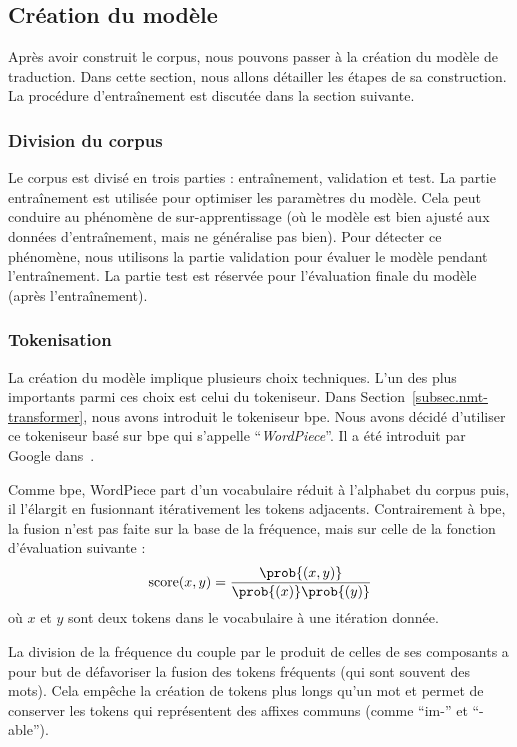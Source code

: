 \subsection{Création du modèle}

Après avoir construit le corpus, nous pouvons passer à la création du modèle de traduction.
Dans cette section, nous allons détailler les étapes de sa construction.
La procédure d'entraînement est discutée dans la section suivante.

\subsubsection{Division du corpus}

Le corpus est divisé en trois parties : entraînement, validation et test.
La partie entraînement est utilisée pour optimiser les paramètres du modèle.
Cela peut conduire au phénomène de sur-apprentissage 
(où le modèle est bien ajusté aux données d'entraînement, mais ne généralise pas bien).
Pour détecter ce phénomène, nous utilisons la partie validation pour évaluer le modèle pendant l'entraînement.
La partie test est réservée pour l'évaluation finale du modèle (après l'entraînement).

\subsubsection{Tokenisation}

La création du modèle implique plusieurs choix techniques.
L'un des plus importants parmi ces choix est celui du tokeniseur.
Dans Section~\ref{subsec.nmt-transformer}, 
nous avons introduit le tokeniseur \gls{bpe}.
Nous avons décidé d'utiliser ce tokeniseur basé sur \gls{bpe} qui s'appelle ``\emph{WordPiece}''.
Il a été introduit par Google dans~\cite{Devlin_Chang_Lee_Toutanova_2019}.

Comme \gls{bpe}, WordPiece part d'un vocabulaire réduit à l'alphabet du corpus
puis, il l'élargit en fusionnant itérativement les tokens adjacents.
Contrairement à \gls{bpe}, la fusion n'est pas faite sur la base de la fréquence,
mais sur celle de la fonction d'évaluation suivante :
\begin{equation}
    \label{eq.wp-score}
    \mathrm{score}(x, y) = \frac{\prob{(x, y)}}{\prob{(x)} \prob{(y)}}
\end{equation}
où \(x\) et \(y\) sont deux tokens dans le vocabulaire à une itération donnée.

La division de la fréquence du couple par le produit de celles de ses composants
a pour but de défavoriser la fusion des tokens fréquents (qui sont souvent des mots).
Cela empêche la création de tokens plus longs qu'un mot et permet de conserver les tokens
qui représentent des affixes communs (comme ``im-'' et ``-able'').

